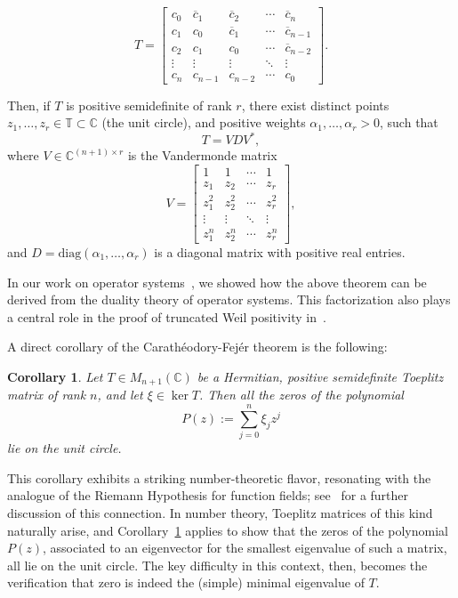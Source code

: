 \documentclass{amsart}
\newtheorem{cor}[thm]{Corollary}
\begin{document}
\[
T = \begin{bmatrix}
c_0 & \overline{c}_1 & \overline{c}_2 & \cdots & \overline{c}_{n} \\
c_1 & c_0 & \overline{c}_1 & \cdots & \overline{c}_{n-1} \\
c_2 & c_1 & c_0 & \cdots & \overline{c}_{n-2} \\
\vdots & \vdots & \vdots & \ddots & \vdots \\
c_{n} & c_{n-1} & c_{n-2} & \cdots & c_0
\end{bmatrix}.
\]

Then, if \(T\) is positive semidefinite of rank \(r\), there exist distinct points \( z_1, \dots, z_r \in \mathbb{T} \subset \mathbb{C} \) (the unit circle), and positive weights \( \alpha_1, \dots, \alpha_r > 0 \), such that
\[
T = V D V^*,
\]
where \( V \in \mathbb{C}^{(n+1) \times r} \) is the Vandermonde matrix
\[
V = \begin{bmatrix}
1 & 1 & \cdots & 1 \\
z_1 & z_2 & \cdots & z_r \\
z_1^2 & z_2^2 & \cdots & z_r^2 \\
\vdots & \vdots & \ddots & \vdots \\
z_1^{n} & z_2^{n} & \cdots & z_r^{n}
\end{bmatrix},
\]
and \( D = \mathrm{diag}(\alpha_1, \dots, \alpha_r) \) is a diagonal matrix with positive real entries.

In our work on operator systems~\cite{CW}, we showed how the above theorem can be derived from the duality theory of operator systems. This factorization also plays a central role in the proof of truncated Weil positivity in~\cite{ckw}.

A direct corollary of the Carathéodory-Fej\'er theorem is the following:

\begin{cor}\label{corcar}
Let \( T \in M_{n+1}(\mathbb{C}) \) be a Hermitian, positive semidefinite Toeplitz matrix of rank \( n  \), and let \( \xi \in \ker T \). Then all the zeros of the polynomial
\[
P(z) := \sum_{j=0}^n \xi_{j} z^j
\]
lie on the unit circle.
\end{cor}

This corollary exhibits a striking number-theoretic flavor, resonating with the analogue of the Riemann Hypothesis for function fields; see~\cite{HP} for a further discussion of this connection. In number theory, Toeplitz matrices of this kind naturally arise, and Corollary~\ref{corcar} applies to show that the zeros of the polynomial \( P(z) \), associated to an eigenvector for the smallest eigenvalue of such a matrix, all lie on the unit circle. The key difficulty in this context, then, becomes the verification that zero is indeed the (simple) minimal eigenvalue of \(T\).
\end{document}

